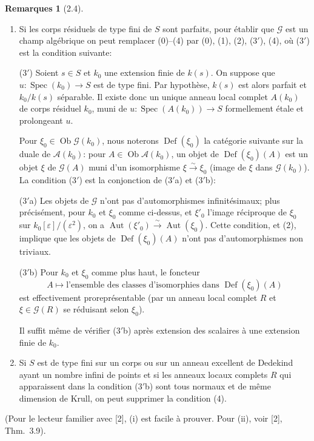 \documentclass[11pt,a4paper]{amsart}
\theoremstyle{plain}
\theoremstyle{definition}
\newtheorem{remarks}[theorem]{Remarques}
\DeclareMathOperator{\Aut}{Aut}
\DeclareMathOperator{\Spec}{Spec}
\DeclareMathOperator{\Def}{Def}
\newcommand{\CG}{\mathcal{G}}
\newcommand{\CA}{\mathcal{A}}
\DeclareMathOperator{\Ob}{Ob}
\begin{document}
\begin{remarks}[2.4]
\ \begin{enumerate}[label=(\roman*)]
\item Si les corps r\'esiduels de type fini de $S$ sont parfaits, pour \'etablir que $\CG$ est un champ alg\'ebrique on peut remplacer (0)--(4) par (0), (1), (2), (3$'$), (4), o\`u (3$'$) est la condition suivante:

(3$'$) Soient $s \in S$ et $k_0$ une extension finie de $k(s)$. On suppose que $u \colon \Spec(k_0) \to S$ est de type fini. Par hypoth\`ese, $k(s)$ est alors parfait et $k_0/k(s)$ s\'eparable. Il existe donc un unique anneau local complet $A(k_0)$ de corps r\'esiduel $k_0$, muni de $u \colon \Spec(A(k_0)) \to S$ formellement \'etale et prolongeant $u$.

Pour $\xi_0 \in \Ob \CG(k_0)$, nous noterons $\Def(\xi_0)$ la cat\'egorie suivante sur la duale de $\CA(k_0)$: pour $A \in \Ob \CA(k_0)$, un objet de $\Def(\xi_0)(A)$ est un objet $\xi$ de $\CG(A)$ muni d'un isomorphisme $\xi \xrightarrow{\sim} \xi_0$ (image de $\xi$ dans $\CG(k_0)$). La condition (3$'$) est la conjonction de (3$'$a) et (3$'$b):

(3$'$a) Les objets de $\CG$ n'ont pas d'automorphismes infinit\'esimaux; plus pr\'ecis\'ement, pour $k_0$ et $\xi_0$ comme ci-dessus, et $\xi'_0$ l'image r\'eciproque de $\xi_0$ sur $k_0[\varepsilon]/(\varepsilon^2)$, on a $\Aut(\xi'_0) \xrightarrow{\sim} \Aut(\xi_0)$. Cette condition, et (2), implique que les objets de $\Def(\xi_0)(A)$ n'ont pas d'automorphismes non triviaux.

(3$'$b) Pour $k_0$ et $\xi_0$ comme plus haut, le foncteur
\[
A \mapsto \text{l'ensemble des classes d'isomorphies dans } \Def(\xi_0)(A)
\]
est effectivement prorepr\'esentable (par un anneau local complet $R$ et $\xi \in \CG(R)$ se r\'eduisant selon $\xi_0$).

Il suffit m\^eme de v\'erifier (3$'$b) apr\`es extension des scalaires \`a une extension finie de $k_0$.

\item Si $S$ est de type fini sur un corps ou sur un anneau excellent de Dedekind ayant un nombre infini de points et si les anneaux locaux complets $R$ qui apparaissent dans la condition (3$'$b) sont tous normaux et de m\^eme dimension de Krull, on peut supprimer la condition (4).
\end{enumerate}

(Pour le lecteur familier avec [2], (i) est facile \`a prouver. Pour (ii), voir [2], Thm.~3.9).
\end{remarks}
\end{document}
